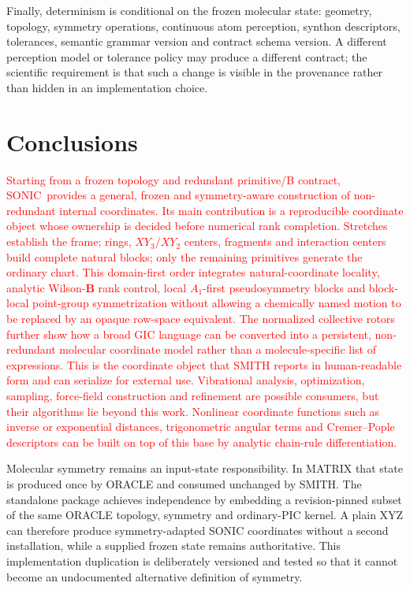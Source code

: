 \documentclass[journal=jctcce,manuscript=article,layout=traditional]{achemso}
\newcommand{\SONIC}{SONIC}
\newcommand{\Bmat}{\mathbf{B}}
\theoremstyle{definition}
\begin{document}
Finally, determinism is conditional on the frozen molecular state:
geometry, topology, symmetry operations, continuous atom perception, synthon
descriptors, tolerances, semantic grammar version and contract schema version.
A different perception model or tolerance policy may produce a different
contract; the scientific requirement is that such a change is visible in the
provenance rather than hidden in an implementation choice.

\section{Conclusions}

\textcolor{red}{Starting from a frozen topology and redundant primitive/B
contract, \SONIC\ provides a general, frozen and symmetry-aware construction
of non-redundant internal coordinates.  Its main contribution is a
reproducible coordinate object whose ownership is decided before numerical
rank completion.  Stretches establish the frame; rings, \(XY_3/XY_2\)
centers, fragments and interaction centers build complete natural blocks;
only the remaining primitives generate the ordinary chart.  This domain-first
order integrates natural-coordinate locality, analytic Wilson-\(\Bmat\) rank
control, local \(A_1\)-first pseudosymmetry blocks and block-local point-group
symmetrization without allowing a chemically named motion to be replaced by
an opaque row-space equivalent.  The normalized collective rotors further
show how a broad GIC language can be converted into a persistent,
non-redundant molecular coordinate model rather than a molecule-specific list
of expressions.  This is the coordinate object that SMITH reports in
human-readable form and can serialize for external use.  Vibrational analysis,
optimization, sampling, force-field construction and refinement are possible
consumers, but their algorithms lie beyond this work.  Nonlinear coordinate
functions such as inverse or exponential distances, trigonometric angular
terms and Cremer--Pople descriptors can be built on top of this base by
analytic chain-rule differentiation.}

Molecular symmetry remains an input-state responsibility.  In MATRIX that
state is produced once by ORACLE and consumed unchanged by SMITH.  The
standalone package achieves independence by embedding a revision-pinned subset
of the same ORACLE topology, symmetry and ordinary-PIC kernel.  A plain XYZ can
therefore produce symmetry-adapted SONIC coordinates without a second
installation, while a supplied frozen state remains authoritative.  This
implementation duplication is deliberately versioned and tested so that it
cannot become an undocumented alternative definition of symmetry.
\end{document}
